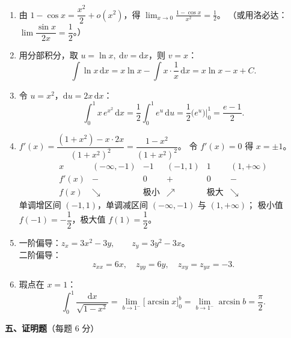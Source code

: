 \documentclass[12pt]{ctexart}
\begin{document}
\begin{enumerate}[label=\textbf{\arabic*.},itemsep=10pt]
\item 由 $1-\cos x=\dfrac{x^{2}}{2}+o(x^{2})$，得
  $\displaystyle\lim_{x\to0}\frac{1-\cos x}{x^{2}}=\frac12$。
  （或用洛必达：$\lim\dfrac{\sin x}{2x}=\dfrac12$。）

\item 用分部积分，取 $u=\ln x,\ \mathrm{d}v=\mathrm{d}x$，则 $v=x$：
  \[
  \int\ln x\,\mathrm{d}x=x\ln x-\int x\cdot\frac1x\,\mathrm{d}x=x\ln x-x+C .
  \]

\item 令 $u=x^{2}$，$\mathrm{d}u=2x\,\mathrm{d}x$：
  \[
  \int_{0}^{1}x\,e^{x^{2}}\,\mathrm{d}x=\frac12\int_{0}^{1}e^{u}\,\mathrm{d}u
  =\frac12\big(e^{u}\big)\Big|_{0}^{1}=\frac{e-1}{2}.
  \]

\item $f'(x)=\dfrac{(1+x^{2})-x\cdot 2x}{(1+x^{2})^{2}}=\dfrac{1-x^{2}}{(1+x^{2})^{2}}$。
  令 $f'(x)=0$ 得 $x=\pm 1$。
  \[
  \begin{array}{c|ccccc}
   x & (-\infty,-1) & -1 & (-1,1) & 1 & (1,+\infty)\\\hline
   f'(x) & - & 0 & + & 0 & -\\
   f(x) & \searrow & \text{极小} & \nearrow & \text{极大} & \searrow
  \end{array}
  \]
  单调增区间 $(-1,1)$，单调减区间 $(-\infty,-1)$ 与 $(1,+\infty)$；
  极小值 $f(-1)=-\dfrac12$，极大值 $f(1)=\dfrac12$。

\item 一阶偏导：$z_{x}=3x^{2}-3y,\qquad z_{y}=3y^{2}-3x$。\\
  二阶偏导：
  \[
  z_{xx}=6x,\quad z_{yy}=6y,\quad z_{xy}=z_{yx}=-3.
  \]

\item 瑕点在 $x=1$：
  \[
  \int_{0}^{1}\frac{\mathrm{d}x}{\sqrt{1-x^{2}}}
  =\lim_{b\to 1^{-}}\big[\arcsin x\big]_{0}^{b}
  =\lim_{b\to1^{-}}\arcsin b=\frac{\pi}{2}.
  \]
\end{enumerate}

\vspace{6pt}
\noindent\textbf{五、证明题}（每题 6 分）
\end{document}
